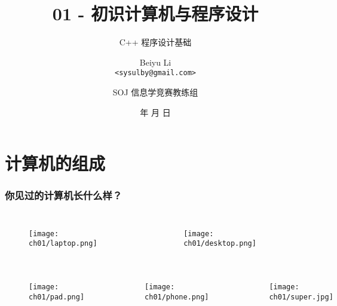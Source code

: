\title[01 - 初识计算机与程序设计]
{01 - 初识计算机与程序设计}

\subtitle{C++ 程序设计基础}

\author[Beiyu Li]
{Beiyu Li\\
\texttt{<sysulby@gmail.com>}}


\date[\today]
{\number\year 年 \number\month 月 \number\day 日}




\author[sysulby]
{SOJ 信息学竞赛教练组}

\begin{frame}
    \titlepage
\end{frame}
\setcounter{framenumber}{0} %


\section{计算机的组成}

\begin{frame}[fragile]
    \frametitle{你见过的计算机长什么样？}

    \begin{columns}
        \begin{figure}
            \texttt{[image: ch01/laptop.png]}
        \end{figure}

        \begin{figure}
            \texttt{[image: ch01/desktop.png]}
        \end{figure}
    \end{columns}
    \begin{columns}
        \begin{figure}
            \texttt{[image: ch01/pad.png]}
        \end{figure}

        \begin{figure}
            \texttt{[image: ch01/phone.png]}
        \end{figure}

        \begin{figure}
            \texttt{[image: ch01/super.jpg]}
        \end{figure}
    \end{columns}
\end{frame}

